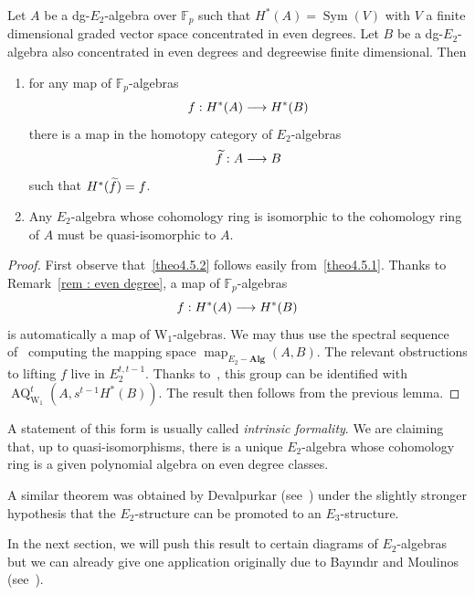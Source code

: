 \documentclass[AHL,Unicode,longabstracts,published]{cedram}
\DeclareMathOperator{\mapp}{map}
\DeclareMathOperator{\AQ}{AQ}
\DeclareMathOperator{\sym}{Sym}
\newcommand{\alg}{\mathbf{Alg}}
\newcommand{\W}{\mathrm{W}}
\newcommand{\FF}{\mathbb{F}}
\renewcommand*{\to}{\mathchoice{\longrightarrow}{\rightarrow}{\rightarrow}{\rightarrow}}
\let\oldtilde\tilde
\renewcommand*{\tilde}[1]{\mathchoice{\widetilde{#1}}{\widetilde{#1}}{\oldtilde{#1}}{\oldtilde{#1}}}
\newcommand{\FF}{\mathbb{F}}
\begin{document}
\begin{theo}\label{theorem : main}


Let $A$ be a dg-$E_2$-algebra over $\FF_p$ such that $H^*(A)=\sym(V)$ with $V$ a finite dimensional graded vector space concentrated in even degrees. Let $B$ be a dg-$E_2$-algebra also concentrated in even degrees and degreewise finite dimensional. Then
\begin{enumerate}
\item\label{theo4.5.1} for any map of $\FF_p$-algebras
\[
f: H^*(A)\to H^*(B)
\]
there is a map in the homotopy category of $E_2$-algebras
\[
\tilde{f}: A\to B
\]
such that $H^*(\tilde{f})=f$.
\item\label{theo4.5.2} Any $E_2$-algebra whose cohomology ring is isomorphic to the cohomology ring of $A$ must be quasi-isomorphic to $A$.
\end{enumerate}
\end{theo}

\begin{proof}
First observe that~\eqref{theo4.5.2} follows easily from~\eqref{theo4.5.1}. Thanks to Remark~\ref{rem : even degree}, a map of $\FF_p$-algebras
\[
f: H^*(A)\to H^*(B)
\]
is automatically a map of $\W_1$-algebras. We may thus use the spectral sequence of~\cite[Theorem~4.5]{johnsonnoel} computing the mapping space $\mapp_{E_2-\alg}(A,B)$. The relevant obstructions to lifting $f$ live in $E_2^{t,t-1}$. Thanks to~\cite[Theorem~B]{johnsonnoel}, this group can be identified with $\AQ^{t}_{\W_1}(A,s^{t-1}H^*(B))$. The result then follows from the previous lemma.
\end{proof}

\begin{rema}
A statement of this form is usually called \emph{intrinsic formality}. We are claiming that, up to quasi-isomorphisms, there is a unique $E_2$-algebra whose cohomology ring is a given polynomial algebra on even degree classes.
\end{rema}

\begin{rema}
A similar theorem was obtained by Devalpurkar (see~\cite[Lemma~2.1.10]{devalapurkarku}) under the slightly stronger hypothesis that the $E_2$-structure can be promoted to an $E_3$-structure.
\end{rema}


In the next section, we will push this result to certain diagrams of $E_2$-algebras but we can already give one application originally due to Bayındır and Moulinos (see~\cite[Theorem~1.3]{bayindirmoulinos}).
\end{document}

